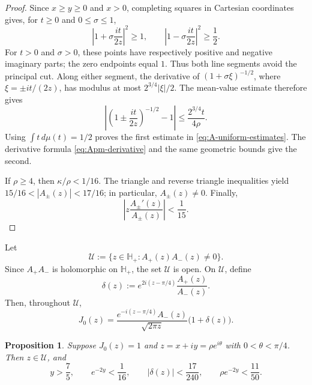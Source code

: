 \documentclass[11pt]{amsart}
\numberwithin{equation}{section}
\newtheorem{proposition}[theorem]{Proposition}
\theoremstyle{definition}
\theoremstyle{remark}
\newcommand{\Hplus}{\mathbb H_+}
\begin{document}
\begin{proof}
Since $x\ge y\ge0$ and $x>0$, completing squares in Cartesian
coordinates gives, for $t\ge0$ and $0\le\sigma\le1$,
\[
   \left|1+\sigma\frac{it}{2z}\right|^2\ge1,
   \qquad
   \left|1-\sigma\frac{it}{2z}\right|^2\ge\frac12.
\]
For $t>0$ and $\sigma>0$, these points have respectively positive and
negative imaginary parts; the zero endpoints equal $1$.  Thus both line
segments avoid the principal cut.  Along either segment, the derivative
of $(1+\sigma\xi)^{-1/2}$, where $\xi=\pm it/(2z)$, has modulus at most
$2^{3/4}|\xi|/2$.  The mean-value estimate therefore gives
\[
   \left|\left(1\pm\frac{it}{2z}\right)^{-1/2}-1\right|
   \le\frac{2^{3/4}t}{4\rho}.
\]
Using $\int t\,d\mu(t)=1/2$ proves the first estimate in
\eqref{eq:A-uniform-estimates}.  The derivative formula
\eqref{eq:Apm-derivative} and the same geometric bounds give the second.

If $\rho\ge4$, then $\kappa/\rho<1/16$.  The triangle and reverse triangle
inequalities yield $15/16<|A_\pm(z)|<17/16$; in particular, $A_\pm(z)\ne0$.
Finally,
\[
   \left|z\frac{A_\pm'(z)}{A_\pm(z)}\right|
   <\frac1{15}.
\]
\end{proof}

Let
\[
   \mathcal U:=\{z\in\Hplus:A_+(z)A_-(z)\ne0\}.
\]
Since $A_+A_-$ is holomorphic on $\Hplus$, the set $\mathcal U$ is open.
On $\mathcal U$, define
\begin{equation}\label{eq:delta-definition}
   \delta(z):=e^{2i(z-\pi/4)}\frac{A_+(z)}{A_-(z)}.
\end{equation}
Then, throughout $\mathcal U$,
\begin{equation}\label{eq:J0-factorized}
   J_0(z)=\frac{e^{-i(z-\pi/4)}A_-(z)}{\sqrt{2\pi z}}
   \bigl(1+\delta(z)\bigr).
\end{equation}

\begin{proposition}\label{prop:quantitative-separation}
Suppose $J_0(z)=1$ and $z=x+iy=\rho e^{i\theta}$ with
$0<\theta<\pi/4$.  Then $z\in\mathcal U$, and
\begin{equation*}
   y>\frac75,\qquad e^{-2y}<\frac1{16},\qquad
   |\delta(z)|<\frac{17}{240},\qquad
   \rho e^{-2y}<\frac{11}{50}.
\end{equation*}
\end{proposition}
\end{document}

